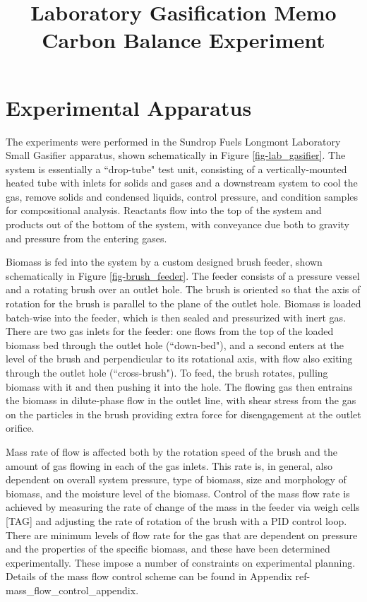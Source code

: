 \documentclass[11pt,twocolumn]{article}
\date{}
\title{Laboratory Gasification Memo\\Carbon Balance Experiment \vspace{-6ex}}
\begin{document}
\twocolumn[
  \begin{@twocolumnfalse}
    \maketitle
    \begin{abstract}
    


    \end{abstract}
  \end{@twocolumnfalse}
]

\section*{Experimental Apparatus}
The experiments were performed in the Sundrop Fuels Longmont Laboratory Small Gasifier apparatus, shown schematically in Figure \ref{fig-lab_gasifier}.  The system is essentially a ``drop-tube" test unit, consisting of a vertically-mounted heated tube with inlets for solids and gases and a downstream system to cool the gas, remove solids and condensed liquids, control pressure, and condition samples for compositional analysis.  Reactants flow into the top of the system and products out of the bottom of the system, with conveyance due both to gravity and pressure from the entering gases.

Biomass is fed into the system by a custom designed brush feeder, shown schematically in Figure \ref{fig-brush_feeder}.  The feeder consists of a pressure vessel and a rotating brush over an outlet hole.  The brush is oriented so that the axis of rotation for the brush is parallel to the plane of the outlet hole.  Biomass is loaded batch-wise into the feeder, which is then sealed and pressurized with inert gas.  There are two gas inlets for the feeder: one flows from the top of the loaded biomass bed through the outlet hole (``down-bed"), and a second enters at the level of the brush and perpendicular to its rotational axis, with flow also exiting through the outlet hole (``cross-brush").  To feed, the brush rotates, pulling biomass with it and then pushing it into the hole.  The flowing gas then entrains the biomass in dilute-phase flow in the outlet line, with shear stress from the gas on the particles in the brush providing extra force for disengagement at the outlet orifice.  

Mass rate of flow is affected both by the rotation speed of the brush and the amount of gas flowing in each of the gas inlets.  This rate is, in general, also dependent on overall system pressure, type of biomass, size and morphology of biomass, and the moisture level of the biomass.  Control of the mass flow rate is achieved by measuring the rate of change of the mass in the feeder via weigh cells [TAG] and adjusting the rate of rotation of the brush with a PID control loop.  There are minimum levels of flow rate for the gas that are dependent on pressure and the properties of the specific biomass, and these have been determined experimentally.  These impose a number of constraints on experimental planning.  Details of the mass flow control scheme can be found in Appendix {ref-mass_flow_control_appendix}.   
\end{document}
